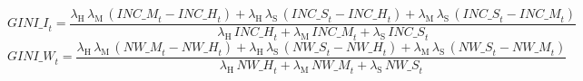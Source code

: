 \begin{dmath}
{GINI\_I}_{t}=\frac{{\lambda_\mathrm{H}}\, {\lambda_\mathrm{M}}\, \left({INC\_M}_{t}-{INC\_H}_{t}\right)+{\lambda_\mathrm{H}}\, {\lambda_\mathrm{S}}\, \left({INC\_S}_{t}-{INC\_H}_{t}\right)+{\lambda_\mathrm{M}}\, {\lambda_\mathrm{S}}\, \left({INC\_S}_{t}-{INC\_M}_{t}\right)}{{\lambda_\mathrm{H}}\, {INC\_H}_{t}+{\lambda_\mathrm{M}}\, {INC\_M}_{t}+{\lambda_\mathrm{S}}\, {INC\_S}_{t}}
\end{dmath}
\begin{dmath}
{GINI\_W}_{t}=\frac{{\lambda_\mathrm{H}}\, {\lambda_\mathrm{M}}\, \left({NW\_M}_{t}-{NW\_H}_{t}\right)+{\lambda_\mathrm{H}}\, {\lambda_\mathrm{S}}\, \left({NW\_S}_{t}-{NW\_H}_{t}\right)+{\lambda_\mathrm{M}}\, {\lambda_\mathrm{S}}\, \left({NW\_S}_{t}-{NW\_M}_{t}\right)}{{\lambda_\mathrm{H}}\, {NW\_H}_{t}+{\lambda_\mathrm{M}}\, {NW\_M}_{t}+{\lambda_\mathrm{S}}\, {NW\_S}_{t}}
\end{dmath}
